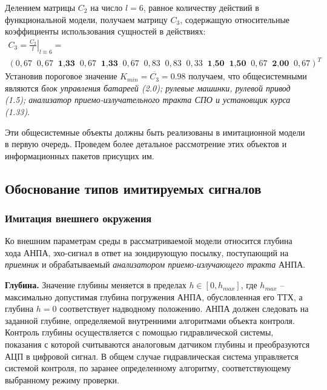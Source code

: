 Делением матрицы $C_2$ на число $l = 6$, равное количеству действий в функциональной модели, получаем матрицу $C_3$,
содержащую относительные коэффициенты использования сущностей в действиях:
\begin{multline}
    C_3 = \left. \frac{C_2}{l} \right|_{l \equiv 6} = \\
        \left( 0,67\;\; 0,67\;\; \textbf{1,33}\;\; 0,67\;\; \textbf{1,33}\;\; 0,67\;\; 0,83\;\; 0,83\;\; 
        0,33\;\; \textbf{1,50}\;\;\textbf{1,50}\;\; 0,67\;\; \textbf{2,00}\;\; 0,67 \right)^T
\end{multline}
Установив пороговое значение $K_{min} = \overline{C_3} = 0.98$ получаем, что общесистемными являются
\textit{блок управления батареей (2.0);
    рулевые машинки, рулевой привод (1.5);
    анализатор приемо-излучательного тракта СПО и установщик курса (1.33)}.

Эти общесистемные объекты должны быть реализованы в имитационной модели в первую очередь.
Проведем более детальное рассмотрение этих объектов и информационных пакетов присущих им.


\subsection{Обоснование типов имитируемых сигналов}\label{sec:model_anpa_params}

\subsubsection{Имитация внешнего окружения}\label{sec:model_anpa:outer_params}
Ко внешним параметрам среды в рассматриваемой модели относится
глубина хода АНПА, эхо-сигнал в ответ на зондирующую посылку,
поступающий на \textit{приемник} и обрабатываемый \textit{анализатором приемо-излучающего тракта} АНПА.

\textbf{Глубина.}
Значение глубины меняется в пределах $h \in [0, h_{max}]$,
где $h_{max}$ -- максимально допустимая глубина погружения АНПА, обусловленная его ТТХ,
а глубина $h = 0$ соответствует надводному положению.
АНПА должен следовать на заданной глубине, определяемой внутренними алгоритмами объекта контроля.
Контроль глубины осуществляется с помощью гидравлической системы,
показания с которой считываются аналоговым датчиком глубины и преобразуются АЦП в цифровой сигнал.
В общем случае гидравлическая система управляется системой контроля,
по заранее определенному алгоритму, соответствующему выбранному режиму проверки.

